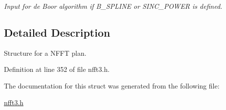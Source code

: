 \begin{CompactItemize}
\begin{CompactList}\small\item\em Input for de Boor algorithm if B\_\-SPLINE or SINC\_\-POWER is defined. \item\end{CompactList}\end{CompactItemize}


\subsection{Detailed Description}
Structure for a NFFT plan. 

Definition at line 352 of file nfft3.h.

The documentation for this struct was generated from the following file:\begin{CompactItemize}
\item 
\hyperlink{nfft3_8h}{nfft3.h}\end{CompactItemize}
